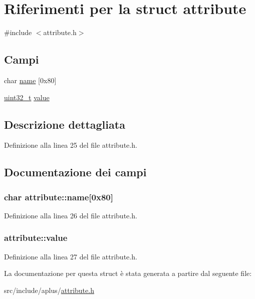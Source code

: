 \hypertarget{structattribute}{\section{Riferimenti per la struct attribute}
\label{structattribute}
}


{\ttfamily \#include $<$attribute.\+h$>$}

\subsection*{Campi}
\begin{DoxyCompactItemize}
\item 
char \hyperlink{structattribute_ab0c3a4d25c5c24cd1ea3af2a6631267d}{name} \mbox{[}0x80\mbox{]}
\item 
\hyperlink{aplus_8h_a53a0df51603c77c2aa5b9ea61b606a82}{uint32\+\_\+t} \hyperlink{structattribute_a868a57c7ba49cfa75755e4061662abe3}{value}
\end{DoxyCompactItemize}


\subsection{Descrizione dettagliata}


Definizione alla linea 25 del file attribute.\+h.



\subsection{Documentazione dei campi}
\hypertarget{structattribute_ab0c3a4d25c5c24cd1ea3af2a6631267d}{
\subsubsection[{name}]{\setlength{\rightskip}{0pt plus 5cm}char attribute\+::name\mbox{[}0x80\mbox{]}}}\label{structattribute_ab0c3a4d25c5c24cd1ea3af2a6631267d}


Definizione alla linea 26 del file attribute.\+h.

\hypertarget{structattribute_a868a57c7ba49cfa75755e4061662abe3}{
\subsubsection[{value}]{ attribute\+::value}}\label{structattribute_a868a57c7ba49cfa75755e4061662abe3}


Definizione alla linea 27 del file attribute.\+h.



La documentazione per questa struct è stata generata a partire dal seguente file\+:\begin{DoxyCompactItemize}
\item 
src/include/aplus/\hyperlink{attribute_8h}{attribute.\+h}\end{DoxyCompactItemize}
